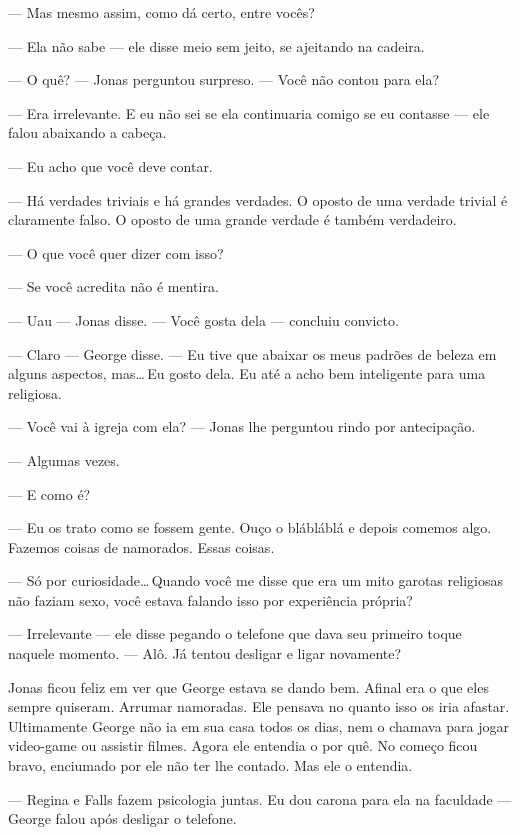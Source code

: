 --- Mas mesmo assim, como dá certo, entre vocês?

--- Ela não sabe --- ele disse meio sem jeito, se ajeitando na cadeira.

--- O quê? --- Jonas perguntou surpreso. --- Você não contou para ela?

--- Era irrelevante. E eu não sei se ela continuaria comigo se eu contasse --- ele falou\mudanca{,} abaixando a cabeça.

--- Eu acho que você deve contar.

--- Há verdades triviais e há grandes verdades. O oposto de uma verdade trivial é claramente falso. O oposto de uma grande verdade é também verdadeiro.

--- O que você quer dizer com isso?

--- Se você acredita não é mentira.

--- Uau --- Jonas disse. --- Você gosta dela --- concluiu\mudanca{,} convicto.

--- Claro --- George disse. --- Eu tive que abaixar os meus padrões de beleza em alguns aspectos, mas\ldots\,Eu gosto dela. Eu até a acho bem inteligente para uma religiosa.

--- Você vai à igreja com ela? --- Jonas lhe perguntou rindo por antecipação.

--- Algumas vezes.

--- E como é?

--- Eu os trato como se fossem gente. Ouço o blábláblá e depois comemos algo. Fazemos coisas de namorados. Essas coisas.

--- Só por curiosidade\ldots\,Quando você me disse que era um mito garotas religiosas não faziam sexo, você estava falando isso por experiência própria?

--- Irrelevante --- ele disse\mudanca{,} pegando o telefone que dava seu primeiro toque naquele momento. --- Alô. Já tentou desligar e ligar novamente?

Jonas ficou feliz em ver que George estava se dando bem. Afinal\mudanca{,} era o que eles sempre quiseram. Arrumar namoradas. Ele pensava no quanto isso os iria afastar. Ultimamente George não ia em sua casa todos os dias, nem o chamava para jogar video-game ou assistir filmes. Agora ele entendia o por quê. No começo ficou bravo, enciumado por ele não ter lhe contado. Mas ele o entendia.

 --- Regina e Falls fazem psicologia juntas. Eu dou carona para ela na faculdade --- George falou após desligar o telefone.

